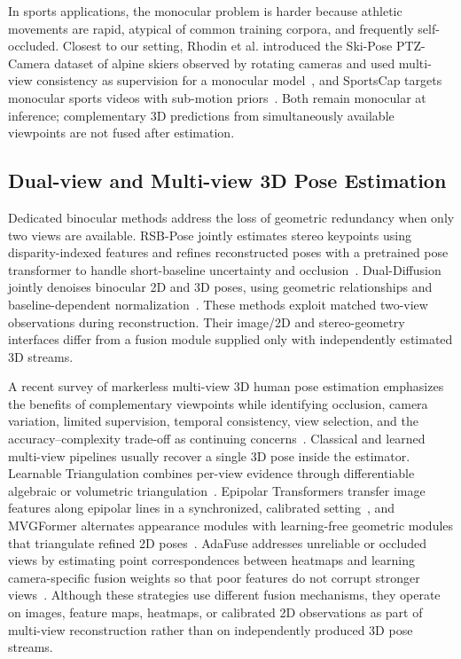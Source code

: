 \documentclass[preprint,12pt]{elsarticle}
\begin{document}
In sports applications, the monocular problem is harder because athletic movements are rapid, atypical of common training corpora, and frequently self-occluded. Closest to our setting, Rhodin et al. introduced the Ski-Pose PTZ-Camera dataset of alpine skiers observed by rotating cameras and used multi-view consistency as supervision for a monocular model~\cite{rhodin2018learning}, and SportsCap targets monocular sports videos with sub-motion priors~\cite{chen2021sportscap}. Both remain monocular at inference; complementary 3D predictions from simultaneously available viewpoints are not fused after estimation.

\subsection{Dual-view and Multi-view 3D Pose Estimation}
Dedicated binocular methods address the loss of geometric redundancy when only two views are available. RSB-Pose jointly estimates stereo keypoints using disparity-indexed features and refines reconstructed poses with a pretrained pose transformer to handle short-baseline uncertainty and occlusion~\cite{wan2025rsb}. Dual-Diffusion jointly denoises binocular 2D and 3D poses, using geometric relationships and baseline-dependent normalization~\cite{wan2024dualdiffusion}. These methods exploit matched two-view observations during reconstruction. Their image/2D and stereo-geometry interfaces differ from a fusion module supplied only with independently estimated 3D streams.

A recent survey of markerless multi-view 3D human pose estimation emphasizes the benefits of complementary viewpoints while identifying occlusion, camera variation, limited supervision, temporal consistency, view selection, and the accuracy--complexity trade-off as continuing concerns~\cite{nogueira2025survey}. Classical and learned multi-view pipelines usually recover a single 3D pose inside the estimator. Learnable Triangulation combines per-view evidence through differentiable algebraic or volumetric triangulation~\cite{iskakov2019learnable}. Epipolar Transformers transfer image features along epipolar lines in a synchronized, calibrated setting~\cite{he2020epipolar}, and MVGFormer alternates appearance modules with learning-free geometric modules that triangulate refined 2D poses~\cite{liao2024multiple}. AdaFuse addresses unreliable or occluded views by estimating point correspondences between heatmaps and learning camera-specific fusion weights so that poor features do not corrupt stronger views~\cite{zhang2021adafuse}. Although these strategies use different fusion mechanisms, they operate on images, feature maps, heatmaps, or calibrated 2D observations as part of multi-view reconstruction rather than on independently produced 3D pose streams.
\end{document}
